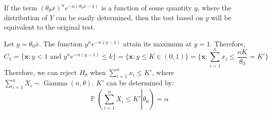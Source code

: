 \documentclass{huhtakm-template-book-v2}
\DeclareMathOperator{\prob}{\mathbb{P}}
\DeclareMathOperator{\Gam}{Gamma}
\begin{document}
\begin{eg}
	If the term $(\theta_{0}\overline{x})^{n}e^{-n(\theta_{0}\overline{x}-1)}$ is a function of some quantity $y$, where the distribution of $Y$ can be easily determined, then the test based on $y$ will be equivalent to the original test.
	
	Let $y=\theta_{0}\overline{x}$. The function $y^{n}e^{-n(y-1)}$ attain its maximum at $y=1$. Therefore,
	\begin{equation*}
		C_{1}=\bigl\{\mathbf{x}:y<1\text{ and }y^{n}e^{-n(y-1)}\leq k\bigr\}=\{\mathbf{x}:y\leq K\in(0,1)\}=\biggl\{\mathbf{x}:\sum_{i=1}^{n}x_{i}\leq\frac{nK}{\theta_{0}}=K'\biggr\}
	\end{equation*}
	Therefore, we can reject $H_{0}$ when $\sum_{i=1}^{n}x_{i}\leq K'$, where $\sum_{i=1}^{n}X_{i}\sim\Gam(n,\theta)$. $K'$ can be determined by:
	\begin{equation*}
		\prob\left(\left.\sum_{i=1}^{n}X_{i}\leq K'\right|\theta_{0}\right)=\alpha
	\end{equation*}
\end{eg}
\end{document}

